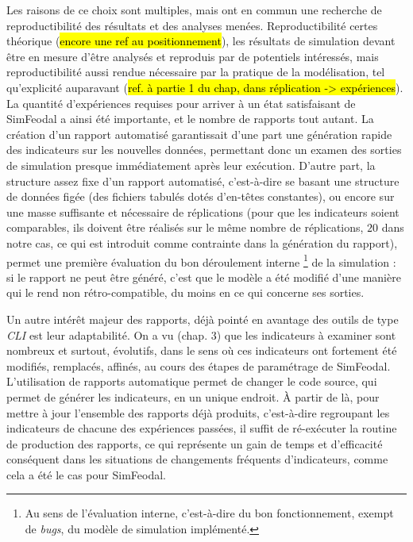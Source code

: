 	Les raisons de ce choix sont multiples, mais ont en commun une recherche de reproductibilité des résultats et des analyses menées.
	Reproductibilité certes théorique (\hl{encore une ref au positionnement}), les résultats de simulation devant être en mesure d'être analysés et reproduis par de potentiels intéressés, mais reproductibilité aussi rendue nécessaire par la pratique de la modélisation, tel qu'explicité auparavant (\hl{ref. à partie 1 du chap, dans réplication -> expériences}).
	La quantité d'expériences requises pour arriver à un état satisfaisant de SimFeodal a ainsi été importante, et le nombre de rapports tout autant.
	La création d'un rapport automatisé garantissait d'une part une génération rapide des indicateurs sur les nouvelles données, permettant donc un examen des sorties de simulation presque immédiatement après leur exécution.
	D'autre part, la structure assez fixe d'un rapport automatisé, c'est-à-dire se basant une structure de données figée (des fichiers tabulés dotés d'en-têtes constantes), ou encore sur une masse suffisante et nécessaire de réplications (pour que les indicateurs soient comparables, ils doivent être réalisés sur le même nombre de réplications, $20$ dans notre cas, ce qui est introduit comme contrainte dans la génération du rapport), permet une première évaluation du bon déroulement \og interne \fg{}\footnote{
	Au sens de l'évaluation interne, c'est-à-dire du bon fonctionnement, exempt de \textit{bugs}, du modèle de simulation implémenté.
	} de la simulation : si le rapport ne peut être généré, c'est que le modèle a été modifié d'une manière qui le rend non rétro-compatible, du moins en ce qui concerne ses sorties.

	Un autre intérêt majeur des rapports, déjà pointé en avantage des outils de type \textit{CLI} est leur adaptabilité.
	On a vu (chap. 3) que les indicateurs à examiner sont nombreux et surtout, évolutifs, dans le sens où ces indicateurs ont fortement été modifiés, remplacés, affinés, au cours des étapes de paramétrage de SimFeodal.
	L'utilisation de rapports automatique permet de changer le code source, qui permet de générer les indicateurs, en un unique endroit.
	À partir de là, pour mettre à jour l'ensemble des rapports déjà produits, c'est-à-dire regroupant les indicateurs de chacune des expériences passées, il suffit de ré-exécuter la routine de production des rapports, ce qui représente un gain de temps et d'efficacité conséquent dans les situations de changements fréquents d'indicateurs, comme cela a été le cas pour SimFeodal.


